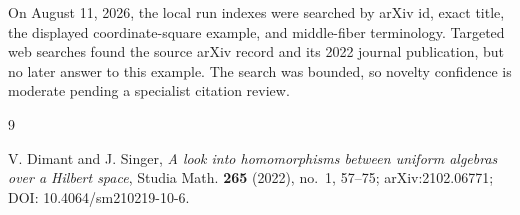 \documentclass[11pt]{article}
\begin{document}
On August 11, 2026, the local run indexes were searched by arXiv id, exact
title, the displayed coordinate-square example, and middle-fiber terminology.
Targeted web searches found the source arXiv record and its 2022 journal
publication, but no later answer to this example.  The search was bounded, so
novelty confidence is moderate pending a specialist citation review.

\begin{thebibliography}{9}

V. Dimant and J. Singer,
\emph{A look into homomorphisms between uniform algebras over a Hilbert
space},
Studia Math. \textbf{265} (2022), no.~1, 57--75;
arXiv:2102.06771; DOI: 10.4064/sm210219-10-6.

\end{thebibliography}
\end{document}
